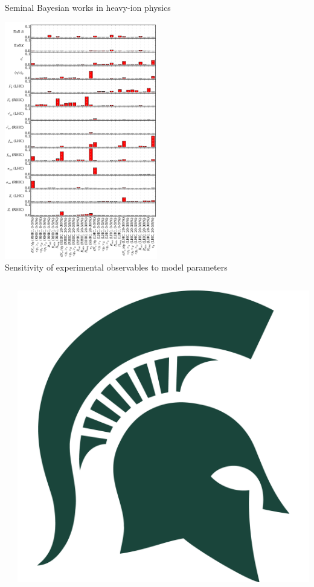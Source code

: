 \documentclass{beamer}
\begin{document}
\begin{frame}{Seminal Bayesian works in heavy-ion physics}
  \vspace{-.5cm}
  \begin{center}
    \includegraphics[width=0.5\textwidth, rotate=-90]{sensitivity}\\[.5ex]
    \scriptsize Sensitivity of experimental observables to model parameters
  \end{center}
  \begin{columns}[T]
    \begin{column}{0.025\textwidth}
    \end{column}
    \begin{column}{0.05\textwidth}
      \raggedleft
      \includegraphics[width=\columnwidth]{michigan-state}

\end{column}
\end{columns}
\end{frame}
\end{document}
